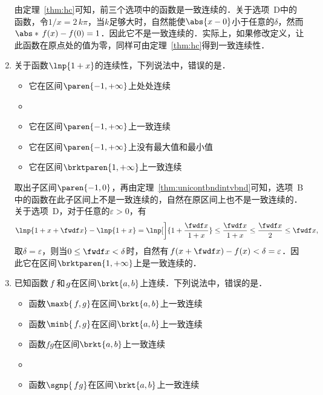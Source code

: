 \begin{enumerate}
  \ifshowsol
  由定理~\ref{thm:hc}可知，前三个选项中的函数是一致连续的．关于选项~D中的函数，令\(1/x = 2\,k\pi\)，当\(k\)足够大时，自然能使\(\abs{x-0}\)小于任意的\(\delta\)，然而\(\abs*{\,f(x) - f(0)} = 1\)．因此它不是一致连续的．实际上，如果修改定义，让此函数在原点处的值为零，同样可由定理~\ref{thm:hc}得到一致连续性．
  \fi

\item 关于函数\(\lnp{1+x}\)的连续性，下列说法中，错误的是\uline{\hspace{10em}}．
  \begin{itemize}
    \renewcommand{\labelitemi}{\faCircleThin}
  \item 它在区间\(\paren{-1,+\infty}\)上处处连续
    \ifshowsol
  \item[\faCircle]
    \else
  \item
    \fi
    它在区间\(\paren{-1,+\infty}\)上一致连续
  \item 它在区间\(\paren{-1,+\infty}\)上没有最大值和最小值
  \item 它在区间\(\brktparen{1,+\infty}\)上一致连续
  \end{itemize}

  \ifshowsol
  取出子区间\(\paren{-1,0}\)，再由定理~\ref{thm:unicontbndintvbnd}可知，选项~B中的函数在此子区间上不是一致连续的，自然在原区间上也不是一致连续的．关于选项~D，对于任意的\(\varepsilon > 0\)，有
  \begin{equation*}
    \lnp{1+x+\fwdf x} - \lnp{1+x} = \lnp[\bigg]{1 + \frac{\fwdf x}{1+x}} \le \frac{\fwdf x}{1+x} \le \frac{\fwdf x}{2} \le \fwdf x,
  \end{equation*}
  取\(\delta = \varepsilon\)，则当\(0 \le \fwdf x < \delta\)时，自然有\(\,f(x+\fwdf x) - f(x) < \delta = \varepsilon\)．因此它在区间\(\brktparen{1,+\infty}\)上是一致连续的．
  \fi

\item 已知函数\(\,f\mkern2mu\)和\(\mkern2mu g\)在区间\(\brkt{a,b}\)上连续．下列说法中，错误的是\uline{\hspace{8em}}．
  \begin{itemize}
    \renewcommand{\labelitemi}{\faCircleThin}
  \item 函数\(\maxb{\,f, g}\)在区间\(\brkt{a,b}\)上一致连续
  \item 函数\(\minb{\,f, g}\)在区间\(\brkt{a,b}\)上一致连续
  \item 函数\(fg\)在区间\(\brkt{a,b}\)上一致连续
    \ifshowsol
  \item[\faCircle]
    \else
  \item
    \fi
    函数\(\sgnp{\,fg}\)在区间\(\brkt{a,b}\)上一致连续
  \end{itemize}


\end{enumerate}
